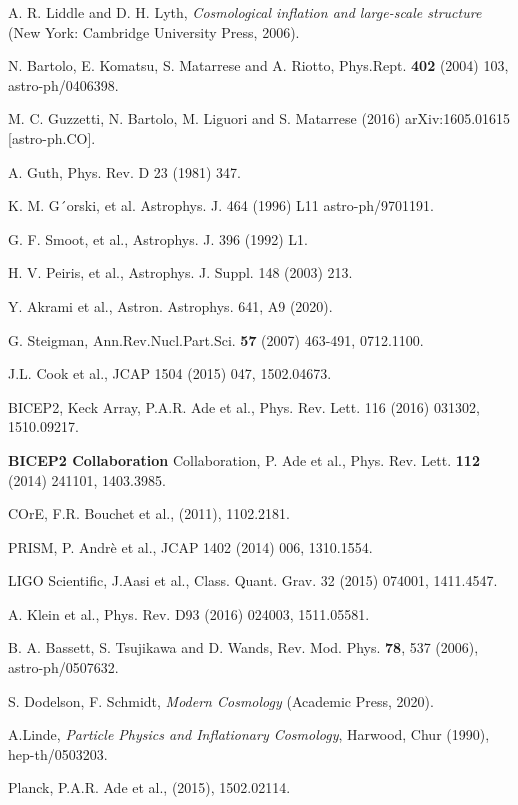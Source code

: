 \documentclass[11pt,a4paper,twoside]{book}
\begin{document}
\begin{thebibliography}{2}
	
	 A. R. Liddle and D. H. Lyth, \emph{Cosmological inflation and large-scale structure} (New York: Cambridge University Press, 2006).
	
	 N. Bartolo, E. Komatsu, S. Matarrese and A. Riotto, Phys.Rept. \textbf{402} (2004) 103, astro-ph/0406398.
	
	 M. C. Guzzetti, N. Bartolo, M. Liguori and S. Matarrese (2016) arXiv:1605.01615 [astro-ph.CO]. 
	
	 A. Guth, Phys. Rev. D 23 (1981) 347.
	
	 K. M. G´orski, et al. Astrophys. J. 464 (1996) L11 astro-ph/9701191.
	
	 G. F. Smoot, et al., Astrophys. J. 396 (1992) L1.

     H. V. Peiris, et al., Astrophys. J. Suppl. 148 (2003) 213.
	
	 Y. Akrami et al., Astron. Astrophys. 641, A9 (2020).
	
	 G. Steigman, Ann.Rev.Nucl.Part.Sci. \textbf{57} (2007) 463-491, 0712.1100.
	
	 J.L. Cook et al., JCAP 1504 (2015) 047, 1502.04673.
	
	 BICEP2, Keck Array, P.A.R. Ade et al., Phys. Rev. Lett. 116 (2016) 031302, 1510.09217.
	
	 \textbf{BICEP2 Collaboration} Collaboration, P. Ade et al., Phys. Rev. Lett. \textbf{112} (2014) 241101, 1403.3985.
	
	 COrE, F.R. Bouchet et al., (2011), 1102.2181.
	
	 PRISM, P. Andrè et al., JCAP 1402 (2014) 006, 1310.1554.
	
	 LIGO Scientific, J.Aasi et al., Class. Quant. Grav. 32 (2015) 074001, 1411.4547.
	
	 A. Klein et al., Phys. Rev. D93 (2016) 024003, 1511.05581.
	
	 B. A. Bassett, S. Tsujikawa and D. Wands, Rev. Mod. Phys. \textbf{78}, 537 (2006), astro-ph/0507632.
	
	 S. Dodelson, F. Schmidt, \emph{Modern Cosmology} (Academic Press, 2020).
	
	 A.Linde, \textit{Particle Physics and Inflationary Cosmology}, Harwood, Chur (1990), hep-th/0503203.
	
	 Planck, P.A.R. Ade et al., (2015), 1502.02114.
		
\end{thebibliography}	
	
\end{document}
